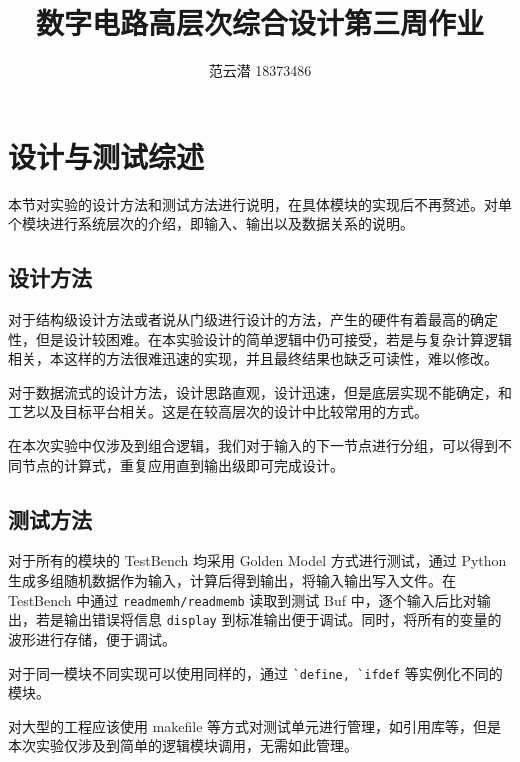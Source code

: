 \documentclass[lang=cn,11pt,a4paper,cite=authoryear]{elegantpaper}
\title{数字电路高层次综合设计\quad 第三周作业}
\author{范云潜 18373486}
\institute{微电子学院 184111 班}
\date{\zhtoday}
\begin{document}
\maketitle


\section{设计与测试综述}

本节对实验的设计方法和测试方法进行说明，在具体模块的实现后不再赘述。对单个模块进行系统层次的介绍，即输入、输出以及数据关系的说明。

\subsection{设计方法}

对于结构级设计方法或者说从门级进行设计的方法，产生的硬件有着最高的确定性，但是设计较困难。在本实验设计的简单逻辑中仍可接受，若是与复杂计算逻辑相关，本这样的方法很难迅速的实现，并且最终结果也缺乏可读性，难以修改。

对于数据流式的设计方法，设计思路直观，设计迅速，但是底层实现不能确定，和工艺以及目标平台相关。这是在较高层次的设计中比较常用的方式。

在本次实验中仅涉及到组合逻辑，我们对于输入的下一节点进行分组，可以得到不同节点的计算式，重复应用直到输出级即可完成设计。

\subsection{测试方法}

对于所有的模块的 TestBench 均采用 Golden Model 方式进行测试，通过 Python 生成多组随机数据作为输入，计算后得到输出，将输入输出写入文件。在 TestBench 中通过 \lstinline{readmemh/readmemb} 读取到测试 Buf 中，逐个输入后比对输出，若是输出错误将信息 \lstinline{display} 到标准输出便于调试。同时，将所有的变量的波形进行存储，便于调试。

对于同一模块不同实现可以使用同样的，通过 \lstinline{`define, `ifdef} 等实例化不同的模块。

对大型的工程应该使用 makefile 等方式对测试单元进行管理，如引用库等，但是本次实验仅涉及到简单的逻辑模块调用，无需如此管理。
\end{document}
